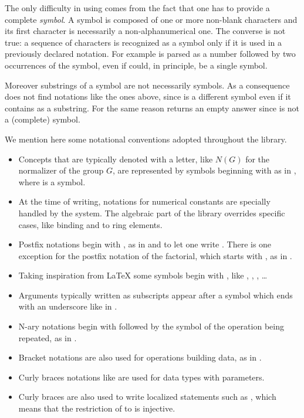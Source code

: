 The only difficulty in using  comes from the fact
that one has to provide a complete \emph{symbol}.  A symbol
is composed of one or more non-blank characters and its first
character is necessarily a non-alphanumerical one.
The converse is not true: a sequence of characters is recognized as
a symbol only if it is used in a previously declared notation.
For example  is parsed as a number followed by two
occurrences of the  symbol, even if  could, in
principle, be a single symbol.

Moreover substrings of a symbol are not necessarily symbols.  As a consequence
 does not find notations like the ones above, since \C{<=} is a
different symbol even if it contains \C{=} as a substring.  For the same reason
 returns an empty answer since  is not a (complete)
symbol.

We mention here some notational conventions
adopted throughout the \mcbMC{} library.


\begin{itemize}
\item Concepts that are typically denoted with a letter, like $N(G)$ for the
	normalizer of the group $G$, are represented by symbols beginning
	with  as in , where  is a symbol.
\item At the time of writing, notations for numerical constants are specially
	handled by the system.  The algebraic part of the library overrides
	specific cases, like binding  and  to ring elements.
\item Postfix notations begin with , as in  and 
	to let one write . There is one exception for
        the postfix notation of the factorial, which starts with
        , as in .
\item Taking inspiration from \LaTeX{} some symbols begin with \C{\\},
	like \C{\\in}, \C{\\matrix}, \C{\\sum}, \ldots
\item Arguments typically written as subscripts appear after a symbol
	which ends with an underscore like  in .
\item N-ary notations begin with \C{[} followed by the symbol of the
	operation being repeated, as in .
\item Bracket notations are also used  for operations building data, as in
	\C{[seq .. | .. ]}.
\item Curly braces notations like  are used for data types
	with parameters.
\item Curly braces are also used to write localized statements
	such as ,
	which means that the restriction of  to  is injective.
\end{itemize}


